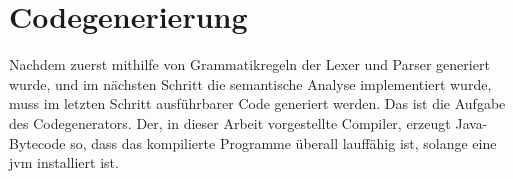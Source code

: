 \chapter{Codegenerierung}
Nachdem zuerst mithilfe von Grammatikregeln der Lexer und Parser generiert wurde, und im nächsten Schritt die semantische Analyse implementiert wurde, muss im letzten Schritt ausführbarer Code generiert werden. Das ist die Aufgabe des Codegenerators. Der, in dieser Arbeit vorgestellte Compiler, erzeugt Java-Bytecode so, dass das kompilierte Programme überall lauffähig ist, solange eine \ac{jvm} installiert ist. 



